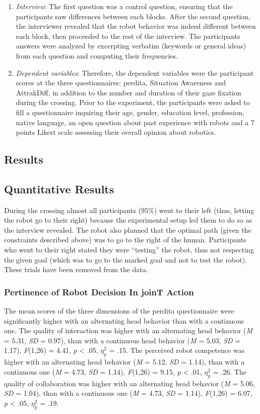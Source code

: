 \documentclass[a4paper,11pt,twoside]{StyleThese}
\begin{document}
\begin{enumerate}
\item \textit{Interview}:
The first question was a control question, ensuring that the participants saw differences between each blocks. After the second question, the interviewer revealed that the robot behavior was indeed different between each block, then proceeded to the rest of the interview. The participants answers were analyzed by excerpting verbatim (keywords or general ideas) from each question and computing their frequencies.

\item \textit{Dependent variables}:
Therefore, the dependent variables were the participant scores at the three questionnaires: \acrshort{perdita}, Situation Awareness and AttrakDiff, in addition to the number and duration of their gaze fixation during the crossing.
Prior to the experiment, the participants were asked to fill a questionnaire inquiring their age, gender, education level, profession, native language, an open question about past experience with robots and a 7 points Likert scale assessing their overall opinion about robotics.
\end{enumerate}

\subsection{Results}
\subsection{Quantitative Results}
During the crossing almost all participants (95\%) went to their left (thus, letting the robot go to their right) because the experimental setup led them to do so as the interview revealed. The robot also planned that the optimal path (given the constraints described above) was to go to the right of the human. Participants who went to their right stated they were ``testing'' the robot, thus not respecting the given goal (which was to go to the marked goal and not to test the robot). These trials have been removed from the data.

\subsubsection{Pertinence of Robot Decision In joinT Action}
The mean scores of the three dimensions of the \acrshort{perdita} questionnaire were significantly higher with an alternating head behavior than with a continuous one. The quality of interaction was higher with an alternating head behavior (\textit{M} = 5.31, \textit{SD} = 0.97), than with a continuous head behavior (\textit{M} = 5.03, \textit{SD} = 1.17), \textit{F}(1,26) = 4.41, \textit{p} < .05, $\eta_{p}^{2}$ = .15. The perceived robot competence was higher with an alternating head behavior (\textit{M} = 5.12, \textit{SD} = 1.14), than with a continuous one (\textit{M} = 4.73, \textit{SD} = 1.14), \textit{F}(1,26) = 9.15, \textit{p} < .01, $\eta_{p}^{2}$ = .26. The quality of collaboration was higher with an alternating head behavior  (\textit{M} = 5.06, \textit{SD} = 1.04), than with a continuous one (\textit{M} = 4.73, \textit{SD} = 1.14), \textit{F}(1,26) = 6.07, \textit{p} < .05, $\eta_{p}^{2}$ = .19.
\end{document}
